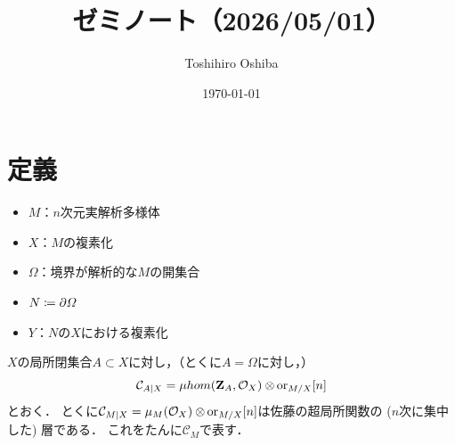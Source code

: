 \DeclarePairedDelimiter{\openintvl}{]}{[}     %
\DeclarePairedDelimiter{\closedintvl}{[}{]}       %
\DeclarePairedDelimiter{\lopenrclosedintvl}{]}{]}    %
\DeclarePairedDelimiter{\lcosedropenintvl}{[}{[}    %


\newcommand{\sm}{\raisebox{2.33pt}{~\rule{6.4pt}{1.3pt}~}}
\newcommand{\smi}{\smallsetminus}

\newcommand{\smid}{\mathrel{;}}

\newcommand{\hfun}[1][]{\mathcal{B}_{#1}}
\newcommand{\mfun}[1][]{\mathcal{C}_{#1}}
\newcommand{\mildhfun}[1][]{\widehat{\mathcal{B}}_{#1}}
\newcommand{\mildmfun}[1][]{\widehat{\mathcal{C}}_{#1}}

\newcommand{\micro}[1]{\mu_{#1}\hspace{0pt}}

\newcommand{\rrp}{\rr^{+}}
\newcommand{\Dbconic}{\mathop{\mathsf{D}^\mathrm{b}_{\rrp}}\nolimits}



\title{ゼミノート（2026/05/01）}
\author{Toshihiro Oshiba}
\date{\today}

\maketitle
\section{定義}
\begin{itemize}
    \item \(M\)：\(n\)次元実解析多様体
    \item \(X\)：\(M\)の複素化
    \item \(\varOmega\)：境界が解析的な\(M\)の開集合
    \item \(N\coloneqq\mathord{\partial}\varOmega\)
    \item \(Y\)：\(N\)の\(X\)における複素化
\end{itemize}
\(X\)の局所閉集合\(A\subset X\)に対し，（とくに\(A=\varOmega\)に対し，）
\[
    \mfun[A\mid X]=\muhom(\zz_A,\cO_X)\tens[]\ori_{M/X}[n]
\]
とおく．
とくに\(
    \mfun[M\mid X]
    =\micro{M}(\cO_X)\tens[]\ori_{M/X}[n]
\)は佐藤の超局所関数の (\(n\)次に集中した) 層である．
これをたんに\({\mfun[M]}\)で表す．

